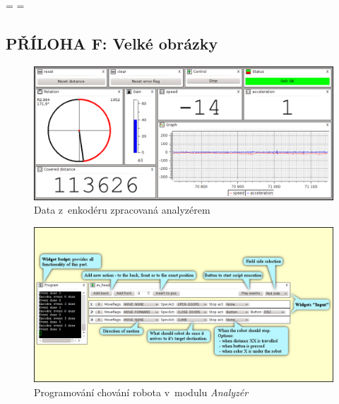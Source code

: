 \documentclass[12pt, a4paper, oneside]{article}
\newcommand{\It}{\textit}  %
\begin{document}
\newpage
\pagestyle{empty}
\textheight=\paperheight
\textwidth=\paperwidth
\voffset=-130pt
\begin{landscape}

\begin{center}
\section*{PŘÍLOHA F: Velké obrázky}
\end{center}

\begin{figure}[h]
\begin{center}
\includegraphics{img/enc_full.png}
\caption{Data z~enkodéru zpracovaná analyzérem}
\label{analyzer_all}
\end{center}
\end{figure}

\newpage
\begin{figure}[h]
\begin{center}
\includegraphics[width=750pt]{img/control_david.png}
\caption{Programování chování robota v~modulu \It{Analyzér}}
\label{david_ctrl}
\end{center}
\end{figure}
\end{landscape}
\end{document}
